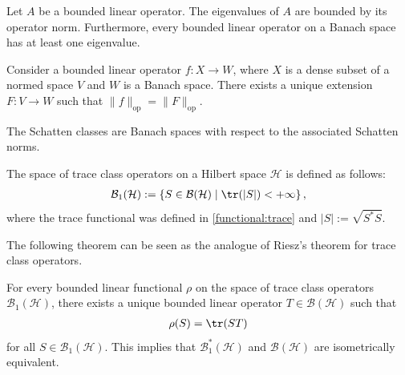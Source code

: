     \begin{property}
        Let $A$ be a bounded linear operator. The eigenvalues of $A$ are bounded by its operator norm. Furthermore, every bounded linear operator on a Banach space has at least one eigenvalue.
    \end{property}

    \begin{property}
        Consider a bounded linear operator $f:X\rightarrow W$, where $X$ is a dense subset of a normed space $V$ and $W$ is a Banach space. There exists a unique extension $F:V\rightarrow W$ such that $\|f\|_{\text{op}}=\|F\|_{\text{op}}$.
    \end{property}

    \begin{property}
        The Schatten classes are Banach spaces with respect to the associated Schatten norms.
    \end{property}

    \begin{example}
        The space of trace class operators on a Hilbert space $\mathcal{H}$ is defined as follows:
        \begin{gather}
            \mathcal{B}_1(\mathcal{H}) := \{S\in\mathcal{B}(\mathcal{H})\mid\tr(|S|)<+\infty\}\,,
        \end{gather}
        where the trace functional was defined in \cref{functional:trace} and $|S|:=\sqrt{S^*S}$.
    \end{example}
    The following theorem can be seen as the analogue of Riesz's theorem for trace class operators.
    \begin{property}
        For every bounded linear functional $\rho$ on the space of trace class operators $\mathcal{B}_1(\mathcal{H})$, there exists a unique bounded linear operator $T\in\mathcal{B}(\mathcal{H})$ such that
        \begin{gather}
            \rho(S) = \tr(ST)
        \end{gather}
        for all $S\in\mathcal{B}_1(\mathcal{H})$. This implies that $\mathcal{B}^*_1(\mathcal{H})$ and $\mathcal{B}(\mathcal{H})$ are isometrically equivalent.
    \end{property}

